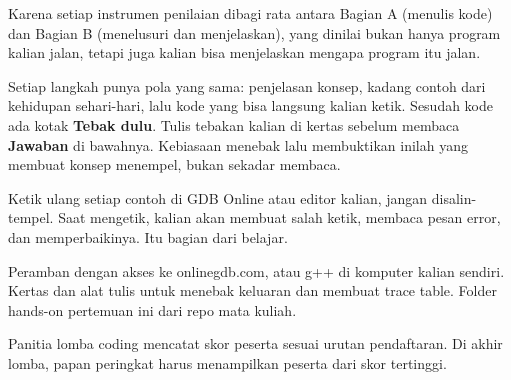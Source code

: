 \documentclass[a4paper]{article}
\begin{document}
\par\vspace{4pt}\par\vspace{6pt}
Karena setiap instrumen penilaian dibagi rata antara Bagian A (menulis kode) dan Bagian B (menelusuri dan menjelaskan), yang dinilai bukan hanya program kalian jalan, tetapi juga kalian bisa menjelaskan mengapa program itu jalan.

Setiap langkah punya pola yang sama: penjelasan konsep, kadang contoh dari kehidupan sehari-hari, lalu kode yang bisa langsung kalian ketik. Sesudah kode ada kotak \textbf{Tebak dulu}. Tulis tebakan kalian di kertas sebelum membaca \textbf{Jawaban} di bawahnya. Kebiasaan menebak lalu membuktikan inilah yang membuat konsep menempel, bukan sekadar membaca.

\begin{Penting}
Ketik ulang setiap contoh di GDB Online atau editor kalian, jangan disalin-tempel. Saat mengetik, kalian akan membuat salah ketik, membaca pesan error, dan memperbaikinya. Itu bagian dari belajar.
\end{Penting}
Peramban dengan akses ke onlinegdb.com, atau g++ di komputer kalian sendiri. Kertas dan alat tulis untuk menebak keluaran dan membuat trace table. Folder hands-on pertemuan ini dari repo mata kuliah.

Panitia lomba coding mencatat skor peserta sesuai urutan pendaftaran. Di akhir lomba, papan peringkat harus menampilkan peserta dari skor tertinggi.
\end{document}
